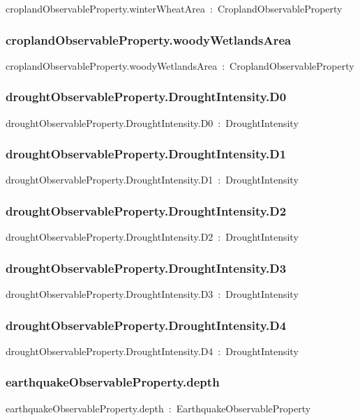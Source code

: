 \documentclass{article}
\begin{document}
croplandObservableProperty.winterWheatArea~:~CroplandObservableProperty

\subsubsection*{croplandObservableProperty.woodyWetlandsArea}

croplandObservableProperty.woodyWetlandsArea~:~CroplandObservableProperty

\subsubsection*{droughtObservableProperty.DroughtIntensity.D0}

droughtObservableProperty.DroughtIntensity.D0~:~DroughtIntensity

\subsubsection*{droughtObservableProperty.DroughtIntensity.D1}

droughtObservableProperty.DroughtIntensity.D1~:~DroughtIntensity

\subsubsection*{droughtObservableProperty.DroughtIntensity.D2}

droughtObservableProperty.DroughtIntensity.D2~:~DroughtIntensity

\subsubsection*{droughtObservableProperty.DroughtIntensity.D3}

droughtObservableProperty.DroughtIntensity.D3~:~DroughtIntensity

\subsubsection*{droughtObservableProperty.DroughtIntensity.D4}

droughtObservableProperty.DroughtIntensity.D4~:~DroughtIntensity

\subsubsection*{earthquakeObservableProperty.depth}

earthquakeObservableProperty.depth~:~EarthquakeObservableProperty
\end{document}
